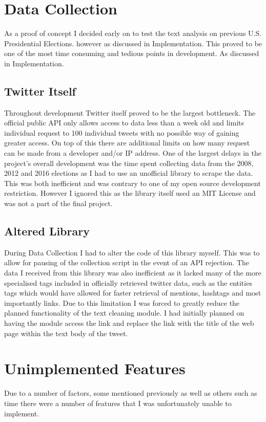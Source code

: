 \documentclass[12pt,a4paper]{report}
\begin{document}
  \section{Data Collection}
  As a proof of concept I decided early on to test the text analysis on previous U.S. Presidential Elections. however as discussed in Implementation. This proved to be one of the most time consuming and tedious points in development. As discussed in Implementation.
    \subsection{Twitter Itself}
    Throughout development Twitter itself proved to be the largest bottleneck. The official public API only allows access to data less than a week old and limits individual request to 100 individual tweets with no possible way of gaining greater access. On top of this there are additional limits on how many request can be made from a developer and/or IP address\cite{TwitterAPILimits}. One of the largest delays in the project’s overall development was the time spent collecting data from the 2008, 2012 and 2016 elections as I had to use an unofficial library to scrape the data. This was both inefficient and was contrary to one of my open source development restriction. However I ignored this as the library itself used an MIT License\cite{MITLicense} and was not a part of the final project. 
    \subsection{Altered Library}
    During Data Collection I had to alter the code of this library myself. This was to allow for pausing of the collection script in the event of an API rejection. The data I received from this library was also inefficient as it lacked many of the more specialised tags included in officially retrieved twitter data, such as the entities tags which would have allowed for faster retrieval of mentions, hashtags and most importantly links. Due to this limitation I was forced to greatly reduce the planned functionality of the text cleaning module. I had initially planned on having the module access the link and replace the link with the title of the web page within the text body of the tweet.
  \section{Unimplemented Features}
  Due to a number of factors, some mentioned previously as well as others such as time there were a number of features that I was unfortunately unable to implement.
\end{document}
